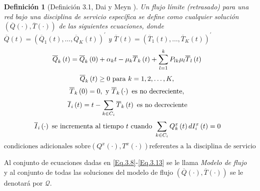 \documentclass{article}
\newtheorem{Def}{Definición}[section]
\numberwithin{equation}{section}
\begin{document}
\begin{Def}[Definici\'on 3.1, Dai y Meyn \cite{DaiSean}]
Un flujo l\'imite (retrasado) para una red bajo una disciplina de
servicio espec\'ifica se define como cualquier soluci\'on
 $\left(\overline{Q}\left(\cdot\right),\overline{T}\left(\cdot\right)\right)$ de las siguientes ecuaciones, donde
$\overline{Q}\left(t\right)=\left(\overline{Q}_{1}\left(t\right),\ldots,\overline{Q}_{K}\left(t\right)\right)^{'}$
y
$\overline{T}\left(t\right)=\left(\overline{T}_{1}\left(t\right),\ldots,\overline{T}_{K}\left(t\right)\right)^{'}$
\begin{equation}\label{Eq.3.8}
\overline{Q}_{k}\left(t\right)=\overline{Q}_{k}\left(0\right)+\alpha_{k}t-\mu_{k}\overline{T}_{k}\left(t\right)+\sum_{l=1}^{k}P_{lk}\mu_{l}\overline{T}_{l}\left(t\right)\\
\end{equation}
\begin{equation}\label{Eq.3.9}
\overline{Q}_{k}\left(t\right)\geq0\textrm{ para }k=1,2,\ldots,K,\\
\end{equation}
\begin{equation}\label{Eq.3.10}
\overline{T}_{k}\left(0\right)=0,\textrm{ y }\overline{T}_{k}\left(\cdot\right)\textrm{ es no decreciente},\\
\end{equation}
\begin{equation}\label{Eq.3.11}
\overline{I}_{i}\left(t\right)=t-\sum_{k\in C_{i}}\overline{T}_{k}\left(t\right)\textrm{ es no decreciente}\\
\end{equation}
\begin{equation}\label{Eq.3.12}
\overline{I}_{i}\left(\cdot\right)\textrm{ se incrementa al tiempo }t\textrm{ cuando }\sum_{k\in C_{i}}Q_{k}^{x}\left(t\right)dI_{i}^{x}\left(t\right)=0\\
\end{equation}
\begin{equation}\label{Eq.3.13}
\textrm{condiciones adicionales sobre
}\left(Q^{x}\left(\cdot\right),T^{x}\left(\cdot\right)\right)\textrm{
referentes a la disciplina de servicio}
\end{equation}
\end{Def}

Al conjunto de ecuaciones dadas en \ref{Eq.3.8}-\ref{Eq.3.13} se
le llama {\em Modelo de flujo} y al conjunto de todas las
soluciones del modelo de flujo
$\left(\overline{Q}\left(\cdot\right),\overline{T}
\left(\cdot\right)\right)$ se le denotar\'a por $\mathcal{Q}$.
\end{document}

